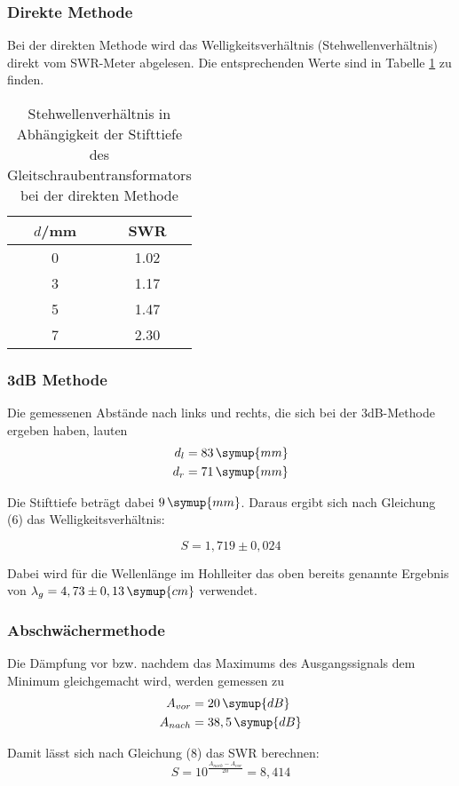\subsubsection{Direkte Methode}
Bei der direkten Methode wird das Welligkeitsverhältnis (Stehwellenverhältnis) direkt
vom SWR-Meter abgelesen. Die entsprechenden Werte sind in Tabelle \ref{tab:direkt} zu finden.

\begin{table}[H]
  \centering
  \caption{Stehwellenverhältnis in Abhängigkeit der Stifttiefe des Gleitschraubentransformators bei der direkten Methode}
  \label{tab:direkt}
  \begin{tabular}{c c}
    \toprule
    $d$/mm & SWR \\
    \midrule
    0 &  1.02    \\
    3 &  1.17    \\
    5 &  1.47    \\
    7 &  2.30    \\
    \bottomrule
  \end{tabular}
\end{table}

\subsubsection{3dB Methode}
Die gemessenen Abstände nach links und rechts, die sich bei der 3dB-Methode ergeben haben,
lauten
\begin{align*}
  d_l &= 83\, \symup{mm} \\
  d_r &= 71\, \symup{mm}
\end{align*}

Die Stifttiefe beträgt dabei $9\, \symup{mm}$.
Daraus ergibt sich nach Gleichung (6) das Welligkeitsverhältnis:

\begin{equation*}
  S = 1,719 \pm 0,024
\end{equation*}

Dabei wird für die Wellenlänge im Hohlleiter das oben bereits genannte Ergebnis von $\lambda_g = 4,73 \pm 0,13 \, \symup{cm}$ verwendet.

\subsubsection{Abschwächermethode}
Die Dämpfung vor bzw. nachdem das Maximums des Ausgangssignals dem Minimum
gleichgemacht wird, werden gemessen zu
\begin{align*}
  A_{vor} &= 20 \, \symup{dB} \\
  A_{nach} &= 38,5 \, \symup{dB}
\end{align*}

Damit lässt sich nach Gleichung (8) das SWR berechnen:
\begin{equation*}
  S = 10^{\frac{A_{nach}-A_{vor}}{20}} = 8,414
\end{equation*}
